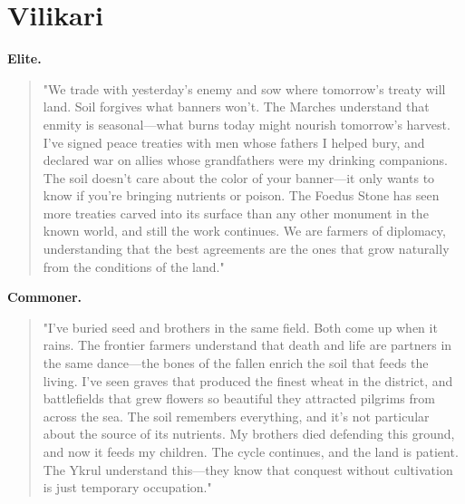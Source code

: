 \section*{Vilikari}
\textbf{Elite.}
\begin{quote}
"We trade with yesterday's enemy and sow where tomorrow's treaty will land. Soil forgives what banners won't. The Marches understand that enmity is seasonal—what burns today might nourish tomorrow's harvest. I've signed peace treaties with men whose fathers I helped bury, and declared war on allies whose grandfathers were my drinking companions. The soil doesn't care about the color of your banner—it only wants to know if you're bringing nutrients or poison. The Foedus Stone has seen more treaties carved into its surface than any other monument in the known world, and still the work continues. We are farmers of diplomacy, understanding that the best agreements are the ones that grow naturally from the conditions of the land."
\end{quote}
\textbf{Commoner.}
\begin{quote}
"I've buried seed and brothers in the same field. Both come up when it rains. The frontier farmers understand that death and life are partners in the same dance—the bones of the fallen enrich the soil that feeds the living. I've seen graves that produced the finest wheat in the district, and battlefields that grew flowers so beautiful they attracted pilgrims from across the sea. The soil remembers everything, and it's not particular about the source of its nutrients. My brothers died defending this ground, and now it feeds my children. The cycle continues, and the land is patient. The Ykrul understand this—they know that conquest without cultivation is just temporary occupation."
\end{quote}

